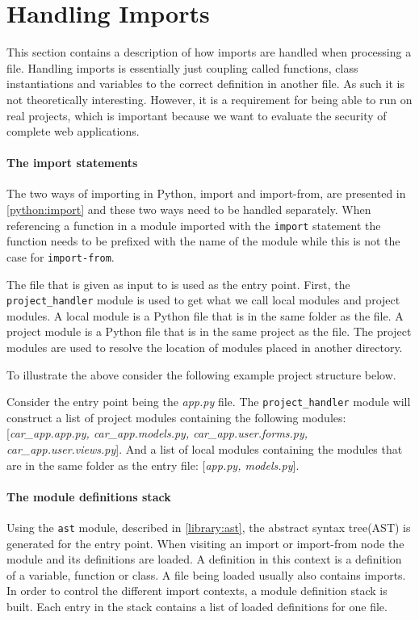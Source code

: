 \section{Handling Imports}
This section contains a description of how imports are handled when processing a file.
Handling imports is essentially just coupling called functions, class instantiations and variables to the correct definition in another file.
As such it is not theoretically interesting.
However, it is a requirement for being able to run \pyt{} on real projects, which is important because we want to evaluate the security of complete web applications.

\paragraph{The import statements}
The two ways of importing in Python, import and import-from, are presented in \cref{python:import} and these two ways need to be handled separately.
When referencing a function in a module imported with the \texttt{import} statement the function needs to be prefixed with the name of the module while this is not the case for \texttt{import-from}.


The file that is given as input to \pyt{} is used as the entry point.
First, the \texttt{project\_handler} module is used to get what we call local modules and project modules.
A local module is a Python file that is in the same folder as the file.
A project module is a Python file that is in the same project as the file.
The project modules are used to resolve the location of modules placed in another directory.

To illustrate the above consider the following example project structure below.

\hfill
{}  
\hfill

Consider the entry point being the \textit{app.py} file.
The \texttt{project\_handler} module will construct a list of project modules containing the following modules: [\textit{car\_app.app.py, car\_app.models.py, car\_app.user.forms.py, car\_app.user.views.py}].
And a list of local modules containing the modules that are in the same folder as the entry file: [\textit{app.py, models.py}].

\paragraph{The module definitions stack}
Using the \texttt{ast} module, described in \cref{library:ast}, the abstract syntax tree(AST) is generated for the entry point.
When visiting an import or import-from node the module and its definitions are loaded.
A definition in this context is a definition of a variable, function or class.
A file being loaded usually also contains imports.
In order to control the different import contexts, a module definition stack is built.
Each entry in the stack contains a list of loaded definitions for one file.

